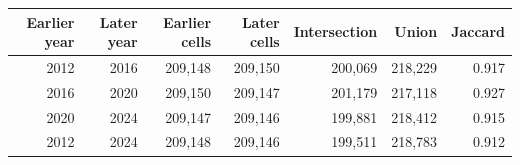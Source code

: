 \begin{tabular}{rrrrrrr}
\toprule
Earlier year & Later year & Earlier cells & Later cells & Intersection & Union & Jaccard\\
\midrule
2012 & 2016 & 209,148 & 209,150 & 200,069 & 218,229 & 0.917\\
2016 & 2020 & 209,150 & 209,147 & 201,179 & 217,118 & 0.927\\
2020 & 2024 & 209,147 & 209,146 & 199,881 & 218,412 & 0.915\\
2012 & 2024 & 209,148 & 209,146 & 199,511 & 218,783 & 0.912\\
\bottomrule
\end{tabular}
\\[0.5em]
\noindent{}
